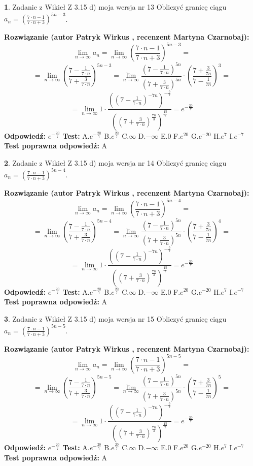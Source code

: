 \documentclass[12pt, a4paper]{article}
\theoremstyle{definition} %
\newtheorem{zad}{}
\newcommand{\zadStart}[1]{\begin{zad}#1\newline}
\newcommand{\zadStop}{\end{zad}}
\newcommand{\rozwStart}[2]{\noindent \textbf{Rozwiązanie (autor #1 , recenzent #2): }\newline}
\newcommand{\rozwStop}{\newline}
\newcommand{\odpStart}{\noindent \textbf{Odpowiedź:}\newline}
\newcommand{\odpStop}{\newline}
\newcommand{\testStart}{\noindent \textbf{Test:}\newline}
\newcommand{\testStop}{\newline}
\newcommand{\kluczStart}{\noindent \textbf{Test poprawna odpowiedź:}\newline}
\newcommand{\kluczStop}{\newline}
\begin{document}
\zadStart{Zadanie z Wikieł Z 3.15 d) moja wersja nr 13}
Obliczyć granicę ciągu $a_{n}=(\frac{7\cdot n - 1}{7 \cdot n + 3})^{5n-3}$.
\zadStop
\rozwStart{Patryk Wirkus}{Martyna Czarnobaj}
$$\lim\limits_{n\to\infty} a_{n} = \lim\limits_{n\to\infty}(\frac{7\cdot n - 1}{7 \cdot n + 3})^{5n-3}=$$
$$=\lim\limits_{n\to\infty}(\frac{7 - \frac{1}{7\cdot n}}{7 + \frac{3}{7 \cdot n}})^{5n-3}=\lim\limits_{n\to\infty}\frac{(7 - \frac{1}{7\cdot n})^{5n}}{(7 + \frac{3}{7\cdot n})^{5n}} \cdot (\frac{7+\frac{3}{7n}}{7-\frac{1}{7n}})^{3}=$$
$$=\lim\limits_{n\to\infty} 1 \cdot \frac{((7-\frac{1}{7 \cdot n})^{-7n})^{-\frac{5}{7}}}{((7+\frac{3}{7 \cdot n})^{\frac{7n}{3}})^{\frac{15}{7}}} =e^{-\frac{20}{7}}$$
\rozwStop
\odpStart
$e^{-\frac{20}{7}}$
\odpStop
\testStart
A.$ e^{-\frac{20}{7}}$
B.$ e^{\frac{20}{7}}$
C.$\infty$
D.$-\infty$
E.$0$
F.$e^{20}$
G.$e^{-20}$
H.$e^{7}$
I.$e^{-7}$
\testStop
\kluczStart
A
\kluczStop



\zadStart{Zadanie z Wikieł Z 3.15 d) moja wersja nr 14}
Obliczyć granicę ciągu $a_{n}=(\frac{7\cdot n - 1}{7 \cdot n + 3})^{5n-4}$.
\zadStop
\rozwStart{Patryk Wirkus}{Martyna Czarnobaj}
$$\lim\limits_{n\to\infty} a_{n} = \lim\limits_{n\to\infty}(\frac{7\cdot n - 1}{7 \cdot n + 3})^{5n-4}=$$
$$=\lim\limits_{n\to\infty}(\frac{7 - \frac{1}{7\cdot n}}{7 + \frac{3}{7 \cdot n}})^{5n-4}=\lim\limits_{n\to\infty}\frac{(7 - \frac{1}{7\cdot n})^{5n}}{(7 + \frac{3}{7\cdot n})^{5n}} \cdot (\frac{7+\frac{3}{7n}}{7-\frac{1}{7n}})^{4}=$$
$$=\lim\limits_{n\to\infty} 1 \cdot \frac{((7-\frac{1}{7 \cdot n})^{-7n})^{-\frac{5}{7}}}{((7+\frac{3}{7 \cdot n})^{\frac{7n}{3}})^{\frac{15}{7}}} =e^{-\frac{20}{7}}$$
\rozwStop
\odpStart
$e^{-\frac{20}{7}}$
\odpStop
\testStart
A.$ e^{-\frac{20}{7}}$
B.$ e^{\frac{20}{7}}$
C.$\infty$
D.$-\infty$
E.$0$
F.$e^{20}$
G.$e^{-20}$
H.$e^{7}$
I.$e^{-7}$
\testStop
\kluczStart
A
\kluczStop



\zadStart{Zadanie z Wikieł Z 3.15 d) moja wersja nr 15}
Obliczyć granicę ciągu $a_{n}=(\frac{7\cdot n - 1}{7 \cdot n + 3})^{5n-5}$.
\zadStop
\rozwStart{Patryk Wirkus}{Martyna Czarnobaj}
$$\lim\limits_{n\to\infty} a_{n} = \lim\limits_{n\to\infty}(\frac{7\cdot n - 1}{7 \cdot n + 3})^{5n-5}=$$
$$=\lim\limits_{n\to\infty}(\frac{7 - \frac{1}{7\cdot n}}{7 + \frac{3}{7 \cdot n}})^{5n-5}=\lim\limits_{n\to\infty}\frac{(7 - \frac{1}{7\cdot n})^{5n}}{(7 + \frac{3}{7\cdot n})^{5n}} \cdot (\frac{7+\frac{3}{7n}}{7-\frac{1}{7n}})^{5}=$$
$$=\lim\limits_{n\to\infty} 1 \cdot \frac{((7-\frac{1}{7 \cdot n})^{-7n})^{-\frac{5}{7}}}{((7+\frac{3}{7 \cdot n})^{\frac{7n}{3}})^{\frac{15}{7}}} =e^{-\frac{20}{7}}$$
\rozwStop
\odpStart
$e^{-\frac{20}{7}}$
\odpStop
\testStart
A.$ e^{-\frac{20}{7}}$
B.$ e^{\frac{20}{7}}$
C.$\infty$
D.$-\infty$
E.$0$
F.$e^{20}$
G.$e^{-20}$
H.$e^{7}$
I.$e^{-7}$
\testStop
\kluczStart
A
\kluczStop
\end{document}
